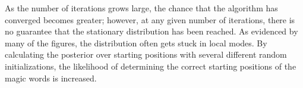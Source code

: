 \documentclass[a4paper,12pt]{article}
\begin{document}
As the number of iterations grows large, the chance that the algorithm has converged becomes greater;
however, at any given number of iterations, there is no guarantee that the stationary distribution has been reached.
As evidenced by many of the figures, the distribution often gets stuck in local modes.
By calculating the posterior over starting positions with several different random initializations,
the likelihood of determining the correct starting positions of the magic words is increased.
\end{document}

